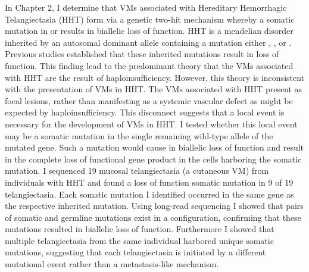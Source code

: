 In Chapter 2, I determine that VMs associated with Hereditary Hemorrhagic Telangiectasia (HHT) form via a genetic two-hit mechanism whereby a somatic mutation in  or  results in biallelic loss of function. HHT is a mendelian disorder inherited by an autosomal dominant allele containing a mutation either , , or . Previous studies established that these inherited mutations result in loss of function. This finding lead to the predominant theory that the VMs associated with HHT are the result of haploinsufficiency. However, this theory is inconsistent with the presentation of VMs in HHT. The VMs associated with HHT present as focal lesions, rather than manifesting as a systemic vascular defect as might be expected by haploinsufficiency. This disconnect suggests that a local event is necessary for the development of VMs in HHT. I tested whether this local event may be a somatic mutation in the single remaining wild-type allele of the mutated gene. Such a mutation would cause in biallelic loss of function and result in the complete loss of functional gene product in the cells harboring the somatic mutation. I sequenced 19 mucosal telangiectasia (a cutaneous VM) from individuals with HHT and found a loss of function somatic mutation in 9 of 19 telangiectasia. Each somatic mutation I identified occurred in the same gene as the respective inherited mutation. Using long-read sequencing I showed that pairs of somatic and germline mutations exist in a  configuration, confirming that these mutations resulted in biallelic loss of function. Furthermore I showed that multiple telangiectasia from the same individual harbored unique somatic mutations, suggesting that each telangiectasia is initiated by a different mutational event rather than a metastasis-like mechanism. 

